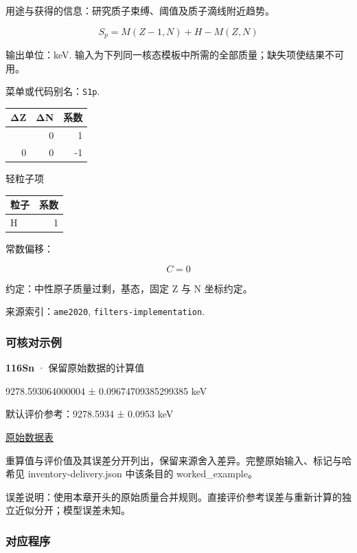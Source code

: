 \documentclass[
  11pt,
  letterpaper,
]{article}
\begin{document}
用途与获得的信息：研究质子束缚、阈值及质子滴线附近趋势。

\[
S_p=M(Z-1,N)+H-M(Z,N)
\]

输出单位：keV.
输入为下列同一核态模板中所需的全部质量；缺失项使结果不可用。

菜单或代码别名：\texttt{S1p}.

\begin{longtable}[]{@{}rrr@{}}
\toprule\noalign{}
ΔZ & ΔN & 系数 \\
\midrule\noalign{}
\endhead
\bottomrule\noalign{}
\endlastfoot
-1 & 0 & 1 \\
0 & 0 & -1 \\
\end{longtable}

轻粒子项

\begin{longtable}[]{@{}lr@{}}
\toprule\noalign{}
粒子 & 系数 \\
\midrule\noalign{}
\endhead
\bottomrule\noalign{}
\endlastfoot
H & 1 \\
\end{longtable}

常数偏移：

\[
C=0
\]

约定：中性原子质量过剩，基态，固定 Z 与 N 坐标约定。

来源索引：\texttt{ame2020}, \texttt{filters-implementation}.

\subsubsection{可核对示例}\label{ux53efux6838ux5bf9ux793aux4f8b-5}

\textbf{116Sn} · 保留原始数据的计算值

9278.593064000004 ± 0.09674709385299385 keV

默认评价参考：9278.5934 ± 0.0953 keV

\href{https://www-nds.iaea.org/amdc/ame2020/rct2_1.mas20.txt}{原始数据表}

重算值与评价值及其误差分开列出，保留来源舍入差异。完整原始输入、标记与哈希见
inventory-delivery.json 中该条目的 worked\_example。

误差说明：使用本章开头的原始质量合并规则。直接评价参考误差与重新计算的独立近似分开；模型误差未知。

\subsubsection{对应程序}\label{ux5bf9ux5e94ux7a0bux5e8f-5}
\end{document}
